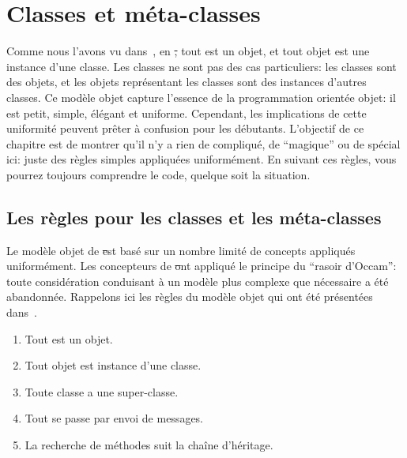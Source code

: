 \documentclass[a4paper,10pt,twoside]{book}
\begin{document}
	\renewcommand{\nnbb}[2]{} %
	\sloppy
\fi
\chapter{Classes et méta-classes}
\label{cha:metaclasses}


Comme nous l'avons vu dans~, en \st, tout est un objet, et tout objet est une instance d'une classe.
Les classes ne sont pas des cas particuliers:
les classes sont des objets, et les objets représentant les classes sont des instances d'autres classes.
Ce modèle objet capture l'essence de la programmation orientée objet: il est petit, simple, élégant et uniforme.
Cependant, les implications de cette uniformité peuvent prêter à confusion pour les débutants.
L'objectif de ce chapitre est de montrer qu'il n'y a rien de compliqué, de ``magique'' ou de spécial ici: juste des règles simples appliquées uniformément. 
En suivant ces règles, vous pourrez toujours comprendre le code, quelque soit la situation.

\section{Les règles pour les classes et les méta-classes}

Le modèle objet de \st est basé sur un nombre limité de concepts appliqués uniformément.
Les concepteurs de \st ont appliqué le principe du ``rasoir d'Occam'': toute considération conduisant à un modèle plus complexe que nécessaire a été abandonnée.
Rappelons ici les règles du modèle objet qui ont été présentées dans~.

\begin{enumerate}[label={\textbf{Règle \arabic{*}}.}, ref={la règle~\arabic{*}}, leftmargin=*, widest=10]
\item{} %
	Tout est un objet.

\item{} %
	Tout objet est instance d'une classe.

\item{} %
	Toute classe a une super-classe.

\item{} %
	Tout se passe par envoi de messages. 

\item{} %
	La recherche de méthodes suit la chaîne d'héritage.
\end{enumerate}
\end{document}

